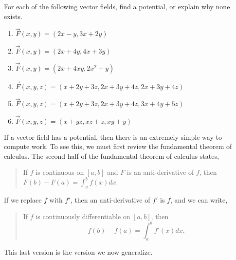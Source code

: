 \newpage
\begin{problem}
%
For each of the following vector fields, find a potential, or explain why none exists.
\begin{enumerate}
 \item $\vec F(x,y)=(2x-y, 3x+2y)$
 \item $\vec F(x,y)=(2x+4y, 4x+3y)$
 \item $\vec F(x,y)=(2x+4xy, 2x^2+y)$
 \item $\vec F(x,y,z)=(x+2y+3z,2x+3y+4z,2x+3y+4z)$
 \item $\vec F(x,y,z)=(x+2y+3z,2x+3y+4z,3x+4y+5z)$
 \item $\vec F(x,y,z)=(x+yz,xz+z,xy+y)$
\end{enumerate}
\end{problem}


If a vector field has a potential, then there is an extremely simple way to compute work. To see this, we must first review the fundamental theorem of calculus. The second half of the fundamental theorem of calculus states,
\begin{quote}
 If $f$ is continuous on $[a,b]$ and $F$ is an anti-derivative of $f$, then $F(b)-F(a) = \int_a^b f(x) dx$.
\end{quote}
If we replace $f$ with $f'$, then an anti-derivative of $f'$ is $f$, and we can write,
\begin{quote}
 If $f$ is continuously differentiable on $[a,b]$, then $$f(b)-f(a)=\int_a^b f'(x) dx.$$
\end{quote}
This last version is the version we now generalize.

